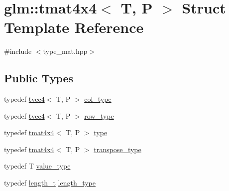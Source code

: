 \hypertarget{structglm_1_1tmat4x4}{}\section{glm\+::tmat4x4$<$ T, P $>$ Struct Template Reference}
\label{structglm_1_1tmat4x4}


{\ttfamily \#include $<$type\+\_\+mat.\+hpp$>$}

\subsection*{Public Types}
\begin{DoxyCompactItemize}
\item 
typedef \mbox{\hyperlink{structglm_1_1tvec4}{tvec4}}$<$ T, P $>$ \mbox{\hyperlink{structglm_1_1tmat4x4_ac879ae9669b754551245231ee992a1ea}{col\+\_\+type}}
\item 
typedef \mbox{\hyperlink{structglm_1_1tvec4}{tvec4}}$<$ T, P $>$ \mbox{\hyperlink{structglm_1_1tmat4x4_a496208229e8d8b1bd58b20584eb6011c}{row\+\_\+type}}
\item 
typedef \mbox{\hyperlink{structglm_1_1tmat4x4}{tmat4x4}}$<$ T, P $>$ \mbox{\hyperlink{structglm_1_1tmat4x4_a74740b596830a6a4c28f8e33965c9d3e}{type}}
\item 
typedef \mbox{\hyperlink{structglm_1_1tmat4x4}{tmat4x4}}$<$ T, P $>$ \mbox{\hyperlink{structglm_1_1tmat4x4_ad1fd4876433fc643c5445fff52be9dc8}{transpose\+\_\+type}}
\item 
typedef T \mbox{\hyperlink{structglm_1_1tmat4x4_a1317abc40eb95911feacd54ee09cabc5}{value\+\_\+type}}
\item 
typedef \mbox{\hyperlink{namespaceglm_a090a0de2260835bee80e71a702492ed9}{length\+\_\+t}} \mbox{\hyperlink{structglm_1_1tmat4x4_aff2734210dc0f3c3c60c49bb1f3e8864}{length\+\_\+type}}
\end{DoxyCompactItemize}
